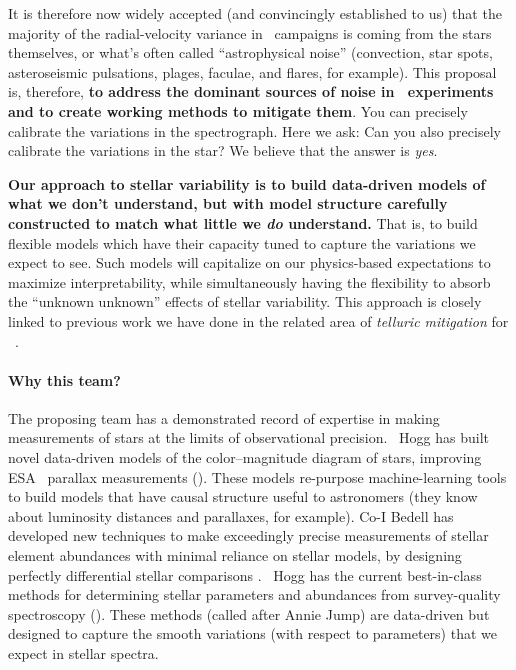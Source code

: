 \documentclass[12pt, letterpaper]{article}
\begin{document}
It is therefore now widely accepted (and convincingly
established to us) that the majority of the radial-velocity variance
in \EPRV\ campaigns is coming from the stars themselves, or what's
often called ``astrophysical noise'' (convection, star spots,
asteroseismic pulsations, plages, faculae, and flares, for example).
This proposal is, therefore, \textbf{to address the dominant sources of
  noise in \EPRV\ experiments and to create working methods to
  mitigate them}.
You can precisely calibrate the variations in the spectrograph.
Here we ask: Can you also precisely calibrate the variations in the star?
We believe that the answer is \emph{yes}.


\textbf{Our approach to stellar variability is to build data-driven models of what
we don't understand, but with model structure carefully constructed to
match what little we \emph{do} understand.}
That is, to build flexible models which have their capacity tuned to
capture the variations we expect to see. 
Such models will capitalize on our physics-based expectations to
maximize interpretability, while simultaneously having the flexibility to absorb 
the ``unknown unknown'' effects of stellar variability.
This approach is closely linked to previous work we have done in the related 
area of \textit{telluric mitigation} for \EPRV\ \citep{Bedell2019}.

\paragraph{Why this team?}
The proposing team has a demonstrated record of expertise in making
measurements of stars at the limits of observational precision. 
\PI\ Hogg has built novel data-driven models of the color--magnitude diagram of
stars, improving ESA \Gaia\ parallax measurements (\citealt{Leistedt, Widmark, Anderson}).
These models re-purpose machine-learning tools to build models that
have causal structure useful to astronomers (they know about
luminosity distances and parallaxes, for example).
Co-I Bedell has developed new techniques to make exceedingly
precise measurements of stellar element abundances with minimal
reliance on stellar models, by designing perfectly differential stellar
comparisons \citep{Bedell2014, Bedell2018}.
\PI\ Hogg has the current best-in-class methods for determining stellar
parameters and abundances from survey-quality spectroscopy (\citealt{Cannon2, Doppel}).
These methods (called  after Annie Jump) are
data-driven but designed to capture the smooth variations (with
respect to parameters) that we expect in stellar spectra.
\end{document}
